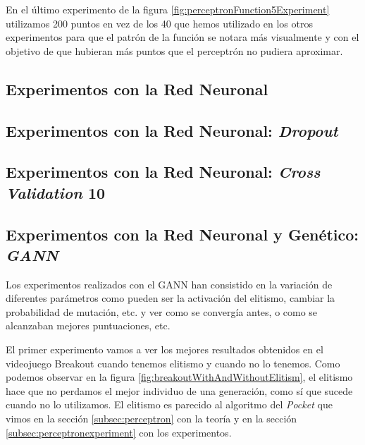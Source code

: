 En el último experimento de la figura \ref{fig:perceptronFunction5Experiment} utilizamos 200 puntos en vez de los 40 que hemos utilizado en los otros experimentos para que el patrón de la función se notara más visualmente y con el objetivo de que hubieran más puntos que el perceptrón no pudiera aproximar.

\newpage
\subsection{Experimentos con la Red Neuronal}
\label{subsec:nnexperiments}

\newpage
\subsection{Experimentos con la Red Neuronal: \textit{Dropout}}
\label{subsubsec:nnexperiments:Dropout}

\newpage
\subsection{Experimentos con la Red Neuronal: \textit{Cross Validation} 10}
\label{subsubsec:nnexperiments:CV10}

\newpage
\subsection{Experimentos con la Red Neuronal y Genético: \textit{GANN}}
\label{subsubsec:nnexperiments:GANN}

Los experimentos realizados con el GANN han consistido en la variación de diferentes parámetros como pueden ser la activación del elitismo, cambiar la probabilidad de mutación, etc. y ver como se convergía antes, o como se alcanzaban mejores puntuaciones, etc.

El primer experimento vamos a ver los mejores resultados obtenidos en el videojuego Breakout cuando tenemos elitismo y cuando no lo tenemos. Como podemos observar en la figura \ref{fig:breakoutWithAndWithoutElitism}, el elitismo hace que no perdamos el mejor individuo de una generación, como sí que sucede cuando no lo utilizamos. El elitismo es parecido al algoritmo del \textit{Pocket} que vimos en la sección \ref{subsec:perceptron} con la teoría y en la sección \ref{subsec:perceptronexperiment} con los experimentos.

